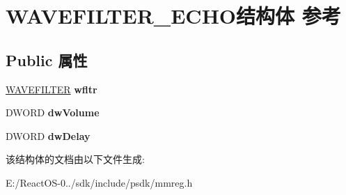 \hypertarget{struct_w_a_v_e_f_i_l_t_e_r___e_c_h_o}{}\section{W\+A\+V\+E\+F\+I\+L\+T\+E\+R\+\_\+\+E\+C\+H\+O结构体 参考}
\label{struct_w_a_v_e_f_i_l_t_e_r___e_c_h_o}
\subsection*{Public 属性}
\begin{DoxyCompactItemize}
\item 
\mbox{\label{struct_w_a_v_e_f_i_l_t_e_r___e_c_h_o_a076b4c10205db49cc6f2edfae11365fc}} 
\hyperlink{struct___w_a_v_e_f_i_l_t_e_r}{W\+A\+V\+E\+F\+I\+L\+T\+ER} {\bfseries wfltr}
\item 
\mbox{\label{struct_w_a_v_e_f_i_l_t_e_r___e_c_h_o_a1e2dd712669cdd90fb731259cf56d782}} 
D\+W\+O\+RD {\bfseries dw\+Volume}
\item 
\mbox{\label{struct_w_a_v_e_f_i_l_t_e_r___e_c_h_o_a5f13269177d6d8306828c6cc8f7a6352}} 
D\+W\+O\+RD {\bfseries dw\+Delay}
\end{DoxyCompactItemize}


该结构体的文档由以下文件生成\+:\begin{DoxyCompactItemize}
\item 
E\+:/\+React\+O\+S-\/0../sdk/include/psdk/mmreg.\+h\end{DoxyCompactItemize}
